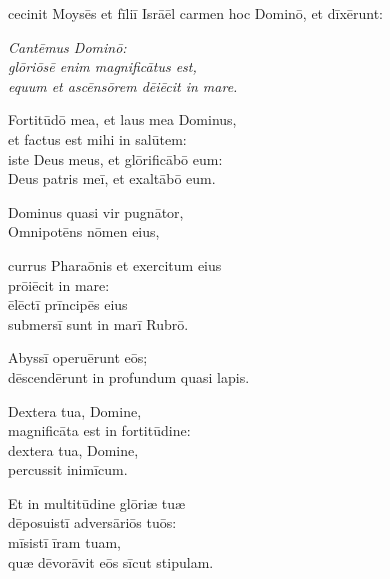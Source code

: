 

\thispagestyle{empty}

 cecinit Moysēs et fīliī Isrāēl
carmen hoc Dominō, et dīxērunt:
\begin{flushleft}
{\it
    Cantēmus Dominō:\\
    glōriōsē enim magnificātus est,\\
    equum et ascēnsōrem dēiēcit in mare.

    Fortitūdō mea, et laus mea Dominus,\\
    et factus est mihi in salūtem:\\
    iste Deus meus, et glōrificābō eum:\\
    Deus patris meī, et exaltābō eum.

    Dominus quasi vir pugnātor,\\
    Omnipotēns nōmen eius,

    currus Pharaōnis et exercitum eius\\
    prōiēcit in mare:\\
    ēlēctī prīncipēs eius\\
    submersī sunt in marī Rubrō.

    Abyssī operuērunt eōs;\\
    dēscendērunt in profundum quasi lapis.

    Dextera tua, Domine,\\
    magnificāta est in fortitūdine:\\
    dextera tua, Domine,\\
    percussit inimīcum.

    Et in multitūdine glōriæ tuæ\\
    dēposuistī adversāriōs tuōs:\\
    mīsistī īram tuam,\\
    quæ dēvorāvit eōs sīcut stipulam.

}
\end{flushleft}
